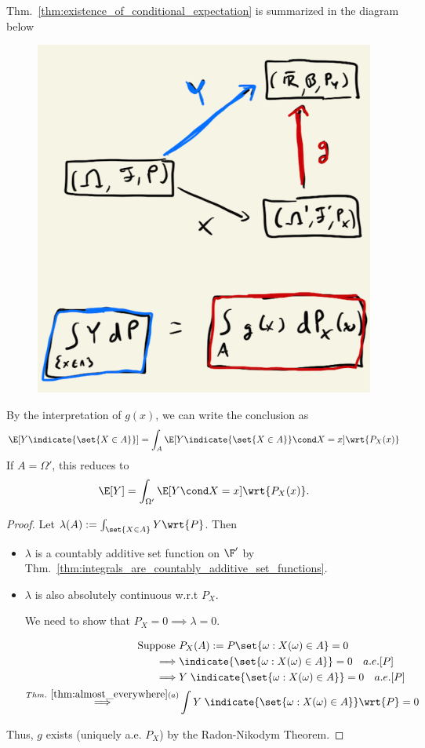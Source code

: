 \documentclass{article} %
\begin{document}
\begin{remark}
Thm.~\ref{thm:existence_of_conditional_expectation} is summarized in the diagram below 
\begin{figure}[H]
\centering
\includegraphics[width=.4\textwidth]{images/existence_of_conditional_expectation}
\end{figure}
By the interpretation of $g(x)$, we can write the conclusion as 
\[ \E[Y \indicate{\set{X \in A}}] = \int_{A} \E[Y \indicate{\set{X \in A}} \cond X=x] \wrt{P_X(x)} \]
If $A=\Omega'$, this reduces to 
\[ \E[Y] = \int_{\Omega'} \E[Y \cond X=x] \wrt{P_X(x)}. \] 
\end{remark}


\begin{proof}
Let $\lambda(A) := \int_{\set{X \in A}} Y \wrt{P}$.
Then 
\begin{itemize}
\item $\lambda$ is a countably additive set function on $\F'$ by Thm.~\ref{thm:integrals_are_countably_additive_set_functions}. 
\item 	$\lambda$ is also absolutely continuous w.r.t $P_X$. \\

\scriptsize{
We need to show that $P_X = 0 \implies \lambda = 0$.

\begin{align*}
\text{ Suppose } & P_X(A) := P\set{\omega : X(\omega) \in A} = 0 \\
\implies &  \indicate{\set{\omega : X(\omega) \in A}} = 0 \quad  a.e. [P] \\
\implies &  Y \; \indicate{\set{\omega : X(\omega) \in A}} = 0 \quad a.e. [P] \\
\stackrel{Thm.~\ref{thm:almost_everywhere} (a)}{\implies} &  \int Y \; \indicate{\set{\omega : X(\omega) \in A}} \wrt{P} = 0  \\
\end{align*}
}
\end{itemize}
Thus, $g$ exists (uniquely a.e. $P_X$) by the Radon-Nikodym Theorem.
\end{proof}
\end{document}
